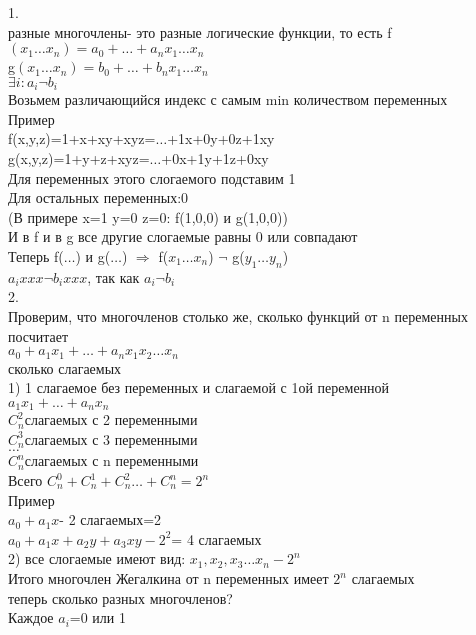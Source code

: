 \documentclass{article}
\begin{document}
1.\\
разные многочлены- это разные логические функции, то есть f$(x_1 \dots x_n)=a_0+\dots+a_nx_1\dots x_n$\\
g$(x_1 \dots x_n)=b_0+\dots+b_nx_1\dots x_n$\\
$\exists i:a_i\neg b_i$\\
Возьмем различающийся индекс с самым min количеством переменных\\
Пример\\
f(x,y,z)=1+x+xy+xyz=$\dots$+1x+0y+0z+1xy\\
g(x,y,z)=1+y+z+xyz=$\dots$+0x+1y+1z+0xy\\
Для переменных этого слогаемого подставим 1\\
Для остальных переменных:0\\
(В примере x=1 y=0 z=0: f(1,0,0) и g(1,0,0))\\
И в f и в g все другие слогаемые равны 0 или совпадают\\
Теперь f($\dots$) и g($\dots$) $\Rightarrow$ f($x_1 \dots x_n$) $\neg$ g($y_1 \dots y_n$)\\
$a_ixxx \neg b_ixxx$, так как $a_i\neg b_i$\\
2.\\
Проверим, что многочленов столько же, сколько функций от n переменных\\
посчитает\\
$a_0+a_1x_1+\dots +a_nx_1x_2 \dots x_n$\\
сколько слагаемых\\
1) 1 слагаемое без переменных и слагаемой с 1ой переменной\\
$a_1x_1+\dots +a_nx_n$\\
$C_n^2$слагаемых с 2 переменными\\
$C_n^3$слагаемых с 3 переменными\\
$\dots$\\
$C_n^n$слагаемых с n переменными\\
Всего $C_n^0+C_n^1+C_n^2\dots +C_n^n=2^n$\\
Пример\\
$a_0+a_1x$- 2 слагаемых=2\\
$a_0+a_1x+a_2y+a_3xy- 2^2$= 4 слагаемых\\
2) все слогаемые имеют вид:  $x_1,x_2,x_3 \dots x_n -2^n$\\
Итого многочлен Жегалкина от n переменных имеет $2^n$ слагаемых\\
теперь сколько разных многочленов?\\
Каждое $a_i$=0 или 1\\
\end{document}
